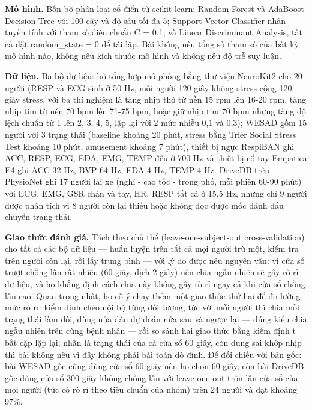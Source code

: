 \documentclass[12pt,a4paper]{article}
\begin{document}
\noindent \textbf{Mô hình.} Bốn bộ phân loại cổ điển từ scikit-learn: Random Forest và AdaBoost Decision Tree với 100 cây và độ sâu tối đa 5; Support Vector Classifier nhân tuyến tính với tham số điều chuẩn C = 0,1; và Linear Discriminant Analysis, tất cả đặt random\_state = 0 để tái lập. Bài không nêu tổng số tham số của bất kỳ mô hình nào, không nêu kích thước mô hình và không nêu độ trễ suy luận.\par\vspace{3pt}
\noindent \textbf{Dữ liệu.} Ba bộ dữ liệu: bộ tổng hợp mô phỏng bằng thư viện NeuroKit2 cho 20 người (RESP và ECG sinh ở 50 Hz, mỗi người 120 giây không stress cộng 120 giây stress, với ba thí nghiệm là tăng nhịp thở từ nền 15 rpm lên 16-20 rpm, tăng nhịp tim từ nền 70 bpm lên 71-75 bpm, hoặc giữ nhịp tim 70 bpm nhưng tăng độ lệch chuẩn từ 1 lên 2, 3, 4, 5, lặp lại với 2 mức nhiễu 0,1 và 0,3); WESAD gồm 15 người với 3 trạng thái (baseline khoảng 20 phút, stress bằng Trier Social Stress Test khoảng 10 phút, amusement khoảng 7 phút), thiết bị ngực RespiBAN ghi ACC, RESP, ECG, EDA, EMG, TEMP đều ở 700 Hz và thiết bị cổ tay Empatica E4 ghi ACC 32 Hz, BVP 64 Hz, EDA 4 Hz, TEMP 4 Hz. DriveDB trên PhysioNet ghi 17 người lái xe (nghỉ - cao tốc - trong phố, mỗi phiên 60-90 phút) với ECG, EMG, GSR chân và tay, HR, RESP tất cả ở 15,5 Hz, nhưng chỉ 9 người được phân tích vì 8 người còn lại thiếu hoặc không đọc được mốc đánh dấu chuyển trạng thái.\par\vspace{3pt}
\noindent \textbf{Giao thức đánh giá.} Tách theo chủ thể (leave-one-subject-out cross-validation) cho tất cả các bộ dữ liệu — huấn luyện trên tất cả mọi người trừ một, kiểm tra trên người còn lại, rồi lấy trung bình — với lý do được nêu nguyên văn: vì cửa sổ trượt chồng lấn rất nhiều (60 giây, dịch 2 giây) nên chia ngẫu nhiên sẽ gây rò rỉ dữ liệu, và họ khẳng định cách chia này không gây rò rỉ ngay cả khi cửa sổ chồng lấn cao. Quan trọng nhất, họ cố ý chạy thêm một giao thức thứ hai để đo lường mức rò rỉ: kiểm định chéo nội bộ từng đối tượng, tức với mỗi người thì chia mỗi trạng thái làm đôi, dùng nửa đầu dự đoán nửa sau và ngược lại — đúng kiểu chia ngẫu nhiên trên cùng bệnh nhân — rồi so sánh hai giao thức bằng kiểm định t bắt cặp lặp lại; nhãn là trạng thái của cả cửa sổ 60 giây, còn dung sai khớp nhịp thì bài không nêu vì đây không phải bài toán dò đỉnh. Để đối chiếu với bản gốc: bài WESAD gốc cũng dùng cửa sổ 60 giây nên họ chọn 60 giây, còn bài DriveDB gốc dùng cửa sổ 300 giây không chồng lấn với leave-one-out trộn lẫn cửa sổ của mọi người (tức có rò rỉ theo tiêu chuẩn của nhóm) trên 24 người và đạt khoảng 97\%.\par\vspace{3pt}
\end{document}

